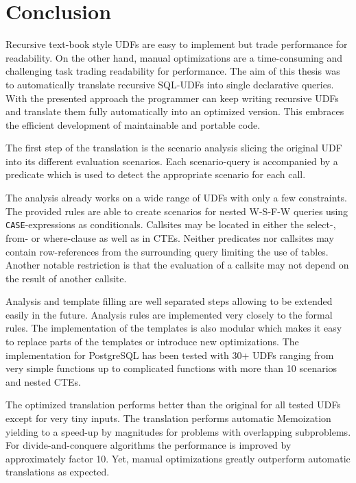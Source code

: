 \chapter{Conclusion} \label{conclusion}



Recursive text-book style UDFs are easy to implement but trade performance for readability. On the other hand, manual optimizations are a time-consuming and challenging task trading readability for performance. The aim of this thesis was to automatically translate recursive SQL-UDFs into single declarative queries.  With the presented approach the programmer can keep writing recursive UDFs and translate them fully automatically into an optimized version. This embraces the efficient development of maintainable and portable code.

The first step of the translation is the scenario analysis slicing the original UDF into its different evaluation scenarios. Each scenario-query is accompanied by a predicate which is used to detect the appropriate scenario for each call.

The analysis already works on a wide range of UDFs with only a few constraints. The provided rules are able to create scenarios for nested W-S-F-W queries using \texttt{CASE}-expressions as conditionals. Callsites may be located in either the select-, from- or where-clause as well as in CTEs. Neither predicates nor callsites may contain row-references from the surrounding query limiting the use of tables. Another notable restriction is that the evaluation of a callsite may not depend on the result of another callsite.

Analysis and template filling are well separated steps allowing to be extended easily in the future. Analysis rules are implemented very closely to the formal rules. The implementation of the templates is also modular which makes it easy to replace parts of the templates or introduce new optimizations. The implementation for PostgreSQL has been tested with 30+ UDFs ranging from very simple functions up to complicated functions with more than 10 scenarios and nested CTEs.

The optimized translation performs better than the original for all tested UDFs except for very tiny inputs. The translation performs automatic Memoization yielding to a speed-up by magnitudes for problems with overlapping subproblems. For divide-and-conquere algorithms the performance is improved by approximately factor 10. Yet, manual optimizations greatly outperform automatic translations as expected.

